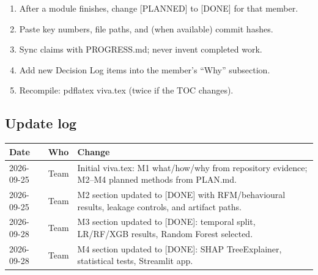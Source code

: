 \documentclass[11pt,a4paper]{article}
\newcommand{\done}{[DONE]}
\newcommand{\planned}{[PLANNED]}
\renewcommand{\texttt}[1]{#1}
\begin{document}
\begin{enumerate}
  \item After a module finishes, change \planned{} to \done{} for that member.
  \item Paste key numbers, file paths, and (when available) commit hashes.
  \item Sync claims with \texttt{PROGRESS.md}; never invent completed work.
  \item Add new Decision Log items into the member's ``Why'' subsection.
  \item Recompile: \texttt{pdflatex viva.tex} (twice if the TOC changes).
\end{enumerate}

\subsection{Update log}
\begin{tabular}{|l|l|p{}|}
\hline
\textbf{Date} & \textbf{Who} & \textbf{Change} \\
\hline
2026-09-25 & Team & Initial \texttt{viva.tex}: M1 what/how/why from repository evidence; M2--M4 planned methods from \texttt{PLAN.md}. \\
\hline
2026-09-25 & Team & M2 section updated to \done{} with RFM/behavioural results, leakage controls, and artifact paths. \\
\hline
2026-09-28 & Team & M3 section updated to \done{}: temporal split, LR/RF/XGB results, Random Forest selected. \\
\hline
2026-09-28 & Team & M4 section updated to \done{}: SHAP TreeExplainer, statistical tests, Streamlit app. \\
\hline
\end{tabular}
\end{document}
